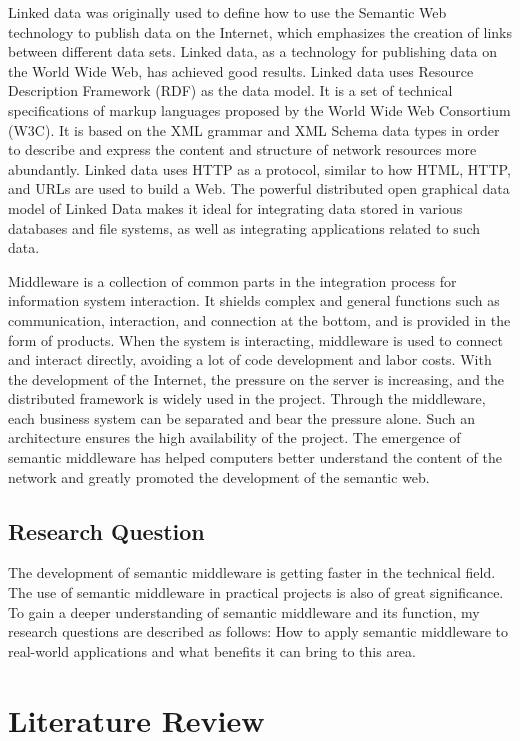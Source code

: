 \documentclass[conference]{IEEEtran}
\begin{document}
Linked data was originally used to define how to use the Semantic Web technology to publish data on the Internet, which emphasizes the creation of links between different data sets. Linked data, as a technology for publishing data on the World Wide Web, has achieved good results. Linked data uses Resource Description Framework (RDF) as the data model. It is a set of technical specifications of markup languages proposed by the World Wide Web Consortium (W3C). It is based on the XML grammar and XML Schema data types in order to describe and express the content and structure of network resources more abundantly. Linked data uses HTTP as a protocol, similar to how HTML, HTTP, and URLs are used to build a Web. The powerful distributed open graphical data model of Linked Data makes it ideal for integrating data stored in various databases and file systems, as well as integrating applications related to such data.

Middleware is a collection of common parts in the integration process for information system interaction. It shields complex and general functions such as communication, interaction, and connection at the bottom, and is provided in the form of products. When the system is interacting, middleware is used to connect and interact directly, avoiding a lot of code development and labor costs. With the development of the Internet, the pressure on the server is increasing, and the distributed framework is widely used in the project. Through the middleware, each business system can be separated and bear the pressure alone. Such an architecture ensures the high availability of the project. The emergence of semantic middleware has helped computers better understand the content of the network and greatly promoted the development of the semantic web.

\subsection{Research Question}
The development of semantic middleware is getting faster in the technical field. The use of semantic middleware in practical projects is also of great significance. To gain a deeper understanding of semantic middleware and its function, my research questions are described as follows: 
How to apply semantic middleware to real-world applications and what benefits it can bring to this area.

\section{Literature Review}
\end{document}
